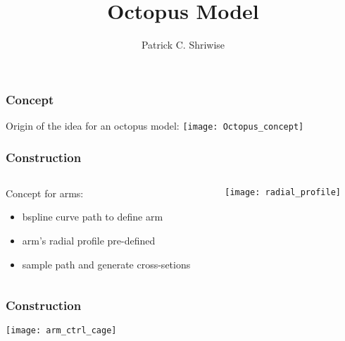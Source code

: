 \documentclass[14pt]{beamer}
\begin{document}
\graphicspath{ {./figures/} }

\title{Octopus Model}
\author{Patrick C. Shriwise}


\maketitle


\begin{frame}
\frametitle{Concept}
\begin{center}
Origin of the idea for an octopus model:
\vfill
\texttt{[image: Octopus\_concept]}
\end{center}

\end{frame}

\begin{frame}
\frametitle{Construction}

\begin{columns}[T]
\begin{column}{0.48\textwidth}
Concept for arms:
\begin{itemize}
\item bspline curve path to define arm
\item arm's radial profile pre-defined
\item sample path and generate cross-setions
\end{itemize}
\end{column}

\hfill

\begin{column}{0.48\textwidth}
\begin{center}
\texttt{[image: radial\_profile]}
\end{center}
\end{column}
\end{columns}

\end{frame}


\begin{frame}
\frametitle{Construction}

\begin{center}
\texttt{[image: arm\_ctrl\_cage]}
\end{center}

\end{frame}
\end{document}
